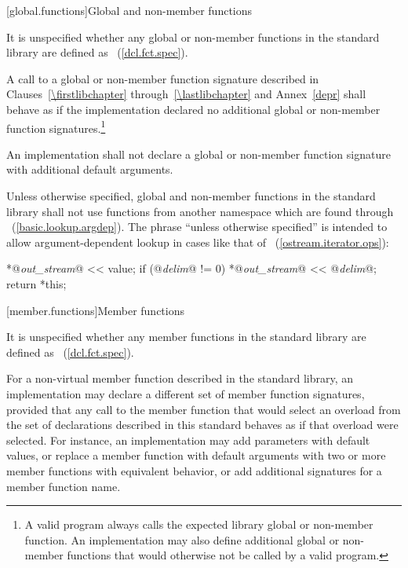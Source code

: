 [global.functions]{Global and non-member functions}

\pnum
It is unspecified whether any global
or non-member
functions in the \Cpp standard library are defined as
~(\ref{dcl.fct.spec}).

\pnum
{}A call to a global or non-member function signature
described in Clauses~\ref{\firstlibchapter} through~\ref{\lastlibchapter} and
Annex~\ref{depr} shall behave as if the implementation declared no additional
global or non-member function signatures.\footnote{A valid \Cpp program always
calls the expected library global or non-member function. An implementation may
also define additional global or non-member functions that would otherwise not
be called by a valid \Cpp program.}

\pnum
An implementation shall not declare a global or non-member function signature
with additional default arguments.

\pnum
Unless otherwise specified, global and non-member functions in the standard
library shall not use functions from another namespace which are found through
~(\ref{basic.lookup.argdep}).
\enternote
The phrase ``unless otherwise specified'' is intended to allow
argument-dependent lookup
in cases like that of
~(\ref{ostream.iterator.ops}):

\effects
\begin{codeblock}
*@\textit{out_stream}@ << value;
if (@\textit{delim}@ != 0)
  *@\textit{out_stream}@ << @\textit{delim}@;
return *this;
\end{codeblock}
\exitnote

[member.functions]{Member functions}

\pnum
It is unspecified whether any member functions in the \Cpp standard library are defined as
~(\ref{dcl.fct.spec}).

\pnum
For a non-virtual member function described in the \Cpp standard library,
an implementation may declare a different set of member function signatures,
provided that any call to the member function that would select
an overload from the set of declarations described in this standard
behaves as if that overload were selected.
\enternote
For instance, an implementation may add parameters with default values,
or replace a member function with default arguments
with two or more member functions with equivalent behavior,
or add additional signatures for a member function name.
\exitnote

